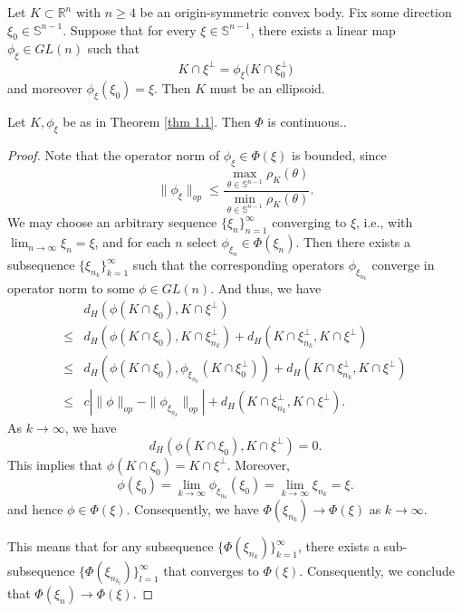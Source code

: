 \documentclass[10pt,a4paper]{amsart}
\newcommand{\Rn}{\mathbb{R}^n}
\newcommand{\sphere}{\mathbb{S}^{n-1}}
\begin{document}
\begin{thm}\label{thm 1.1}
    Let $K \subset \Rn$ with $n \ge 4$ be an origin-symmetric convex body. Fix some direction $\xi_0 \in \sphere$. Suppose that for every $\xi \in \sphere$, there exists a linear map $\phi_\xi \in GL(n)$ such that
\[
K \cap \xi^\perp = \phi_\xi\bigl(K \cap \xi_0^\perp\bigr)
\]
and moreover $\phi_\xi(\xi_0) = \xi$. Then $K$ must be an ellipsoid.
\end{thm}

\begin{lem}\label{lem 3.2}
     Let $K, \phi_\xi$ be as in Theorem \ref{thm 1.1}. Then $\Phi$ is continuous..
\end{lem}

\begin{proof}
Note that the operator norm of $\phi_\xi\in \Phi(\xi)$ is bounded, since 
$$
\|\phi_\xi\|_{op}\leq \frac{\max_{\theta\in \sphere}\rho_K(\theta)}{\min_{\theta\in \sphere}\rho_K(\theta)}.
$$
We may choose an arbitrary sequence $\{\xi_n\}_{n=1}^\infty$ converging to $\xi$, i.e., with $\lim_{n\to\infty}\xi_n=\xi$, and for each $n$ select $\phi_{\xi_n}\in \Phi(\xi_n)$. Then there exists a subsequence $\{\xi_{n_k}\}_{k=1}^\infty$ such that the corresponding operators $\phi_{\xi_{n_k}}$ converge in operator norm to some $\phi\in GL(n)$. And thus, we have
\begin{align*}
    & d_{H}(\phi(K\cap \xi_0),K\cap\xi^\perp)\\
     \leq & d_{H}(\phi(K\cap \xi_0), K\cap\xi_{n_k}^\perp)+d_H(K\cap\xi_{n_k}^\perp, K\cap\xi^\perp)\\
    \leq & d_{H}(\phi(K\cap \xi_0), \phi_{\xi_{n_k}}(K\cap\xi_0^\perp))+d_H(K\cap\xi_{n_k}^\perp, K\cap\xi^\perp)\\
    \leq & c \left|\|\phi\|_{op}-\|\phi_{\xi_{n_k}}\|_{op}\right|+d_H(K\cap\xi_{n_k}^\perp, K\cap\xi^\perp).
\end{align*}
As $k\to \infty$, we have
$$
d_{H}(\phi(K\cap \xi_0),K\cap\xi^\perp)=0.
$$
This implies that $\phi(K\cap \xi_0)=K\cap\xi^\perp$. Moreover,
$$
\phi(\xi_0)=\lim_{k\to\infty}\phi_{\xi_{n_k}}(\xi_0)=\lim_{k\to\infty}\xi_{n_k}=\xi.
$$
and hence $\phi\in \Phi(\xi)$. Consequently, we have $\Phi(\xi_{n_k})\to \Phi(\xi)$ as $k\to \infty$.

This means that for any subsequence $\{\Phi(\xi_{n_k})\}_{k=1}^\infty$, there exists a sub-subsequence $\{\Phi(\xi_{n_{k_l}})\}_{l=1}^\infty$ that converges to $\Phi(\xi)$. Consequently, we conclude that $\Phi(\xi_n) \to \Phi(\xi)$.
\end{proof}
\end{document}

